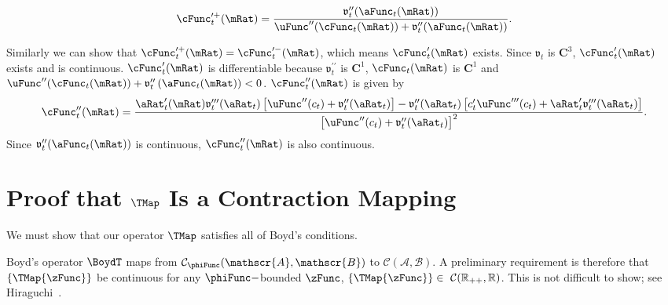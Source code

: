 \documentclass[\econtexRoot/BufferStockTheory]{subfiles}
\begin{document}
\begin{equation*}
\cFunc_{t}^{\prime +}(\mRat)=\frac{\mathfrak{v}_{t}^{\prime \prime }({\aFunc}_{t}(\mRat))}{\uFunc^{\prime \prime
}(\cFunc_{t}(\mRat))+\mathfrak{v}_{t}^{\prime \prime }({\aFunc}_{t}(\mRat))}.
\end{equation*}

Similarly we can show that $\cFunc_{t}^{\prime +}(\mRat)=\cFunc_{t}^{\prime -}(\mRat)$,
which means $\cFunc_{t}^{\prime }(\mRat)$ exists. Since $\mathfrak{v}_{t}$ is
$\mathbf{C}^{3}$, $ \cFunc_{t}^{\prime }(\mRat)$ exists and is continuous.
$\cFunc_{t}^{\prime }(\mRat)$ is differentiable because
$\mathfrak{v}_{t}^{\prime \prime }$ is $\mathbf{C}^{1}$, $ \cFunc_{t}(\mRat)$
is $\mathbf{C}^{1}$ and $\uFunc^{\prime \prime
}(\cFunc_{t}(\mRat))+\mathfrak{v}_{t}^{\prime \prime }\left( {\aFunc}_{t}(\mRat)\right)
<0$. $\cFunc_{t}^{\prime \prime }(\mRat)$ is given by
\begin{equation}
\cFunc_{t}^{\prime \prime }(\mRat)=\frac{{\aRat}_{t}^{\prime }(\mRat)\mathfrak{v}_{t}^{\prime \prime
\prime }({\aRat}_{t})\left[ \uFunc^{\prime \prime }(c_{t})+\mathfrak{v}_{t}^{\prime \prime }({\aRat}_{t})
\right] -\mathfrak{v}_{t}^{\prime \prime }({\aRat}_{t})\left[ c_{t}^{\prime }\uFunc^{\prime \prime
\prime }(c_{t})+{\aRat}_{t}^{\prime }\mathfrak{v}_{t}^{\prime \prime \prime }({\aRat}_{t})\right] }{
\left[ \uFunc^{\prime \prime }(c_{t})+\mathfrak{v}_{t}^{\prime \prime }({\aRat}_{t})\right] ^{2}}.
\end{equation}
Since $\mathfrak{v}_{t}^{\prime \prime }({\aFunc}_{t}(\mRat))$ is continuous,
$\cFunc_{t}^{\prime \prime }(\mRat)$ is also continuous.

\hypertarget{It-Is-A-Contraction-Mapping}{}
\section{Proof that $\TMap$ Is a Contraction Mapping}\label{sec:Tcomplete}

We must show that our operator $\TMap$ satisfies all of Boyd's
conditions.

Boyd's operator $\BoydT$ maps from
$\mathcal{C}_{\phiFunc}(\mathscr{A},\mathscr{B})$ to
$\mathcal{C}(\mathscr{A},\mathscr{B}).$ A preliminary requirement is
therefore that $\{\TMap{\zFunc}\}$ be continuous for any $\phiFunc-$bounded $\zFunc$,
$\{\TMap{\zFunc}\}\in~\mathcal{C}(\mathbb{R}_{++},\mathbb{R})$.  This is not
difficult to show; see Hiraguchi~\citeyearpar{hiraguchiBSProofs}.
\end{document}
